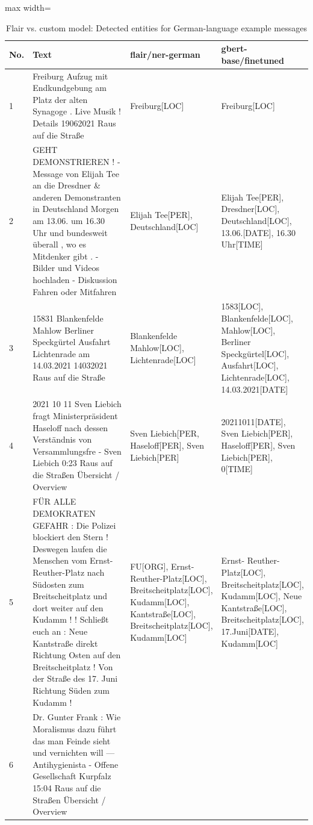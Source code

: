 \begin{table}[htp]
\caption{Flair vs. custom model: Detected entities for German-language example messages}
\label{tab:detect_ents_custom_vs_flair}
\centering
\begin{adjustbox}{max width=\textwidth}
\begin{tabular}{|p{0.04\linewidth}|p{0.6\linewidth}|p{0.3\linewidth}|p{0.35\linewidth}|}
\hline
\textbf{No.} & \textbf{Text} & \textbf{flair/ner-german} & \textbf{gbert-base/finetuned} \\
\hline 
1 
& Freiburg Aufzug mit Endkundgebung am Platz der alten
Synagoge . Live Musik ! Details 19062021 Raus auf die Straße 
& Freiburg[LOC] 
& Freiburg[LOC]\\
\hline
2 
& GEHT DEMONSTRIEREN ! - Message von Elijah Tee an die Dresdner \& anderen Demonstranten in Deutschland Morgen am 13.06. um 16.30 Uhr und bundesweit überall , wo es Mitdenker gibt . - Bilder und Videos hochladen - Diskussion Fahren oder Mitfahren
& Elijah Tee[PER], Deutschland[LOC] 
& Elijah Tee[PER], Dresdner[LOC], Deutschland[LOC], 13.06.[DATE], 16.30 Uhr[TIME]\\ 
\hline
3 
& 15831 Blankenfelde Mahlow Berliner Speckgürtel Ausfahrt Lichtenrade am 14.03.2021 14032021 Raus auf die Straße
& Blankenfelde Mahlow[LOC], Lichtenrade[LOC] 
& 1583[LOC], Blankenfelde[LOC], Mahlow[LOC], Berliner Speckgürtel[LOC], Ausfahrt[LOC], Lichtenrade[LOC], 14.03.2021[DATE]\\
\hline
4 
& 2021 10 11 Sven Liebich fragt Ministerpräsident Haseloff nach dessen Verständnis 
von Versammlungsfre - Sven Liebich 0:23 Raus auf die Straßen  \"Ubersicht / Overview 
& Sven Liebich[PER, Haseloff[PER], Sven Liebich[PER]
& 20211011[DATE], Sven Liebich[PER], Haseloff[PER], Sven Liebich[PER], 0[TIME]\\ 
\hline
5 
& F\"UR ALLE DEMOKRATEN   GEFAHR : Die Polizei blockiert den Stern !   Deswegen laufen die Menschen vom Ernst-Reuther-Platz nach Südosten zum Breitscheitplatz und dort weiter auf den Kudamm ! ! Schließt euch an : Neue Kantstraße direkt Richtung Osten auf den Breitscheitplatz ! Von der Straße des 17. Juni Richtung Süden zum Kudamm ! 
& FU[ORG], Ernst-Reuther-Platz[LOC], Breitscheitplatz[LOC], Kudamm[LOC], Kantstraße[LOC], Breitscheitplatz[LOC], Kudamm[LOC]
& Ernst- Reuther- Platz[LOC], Breitscheitplatz[LOC], Kudamm[LOC], Neue Kantstraße[LOC], Breitscheitplatz[LOC], 17.Juni[DATE], Kudamm[LOC]\\ 
\hline
6 
& Dr. Gunter Frank : Wie Moralismus dazu führt das man Feinde sieht und vernichten will — Antihygienista - Offene Gesellschaft Kurpfalz 15:04 Raus auf die Straßen   \"Ubersicht / Overview 

\end{tabular}
\end{adjustbox}
\end{table}
